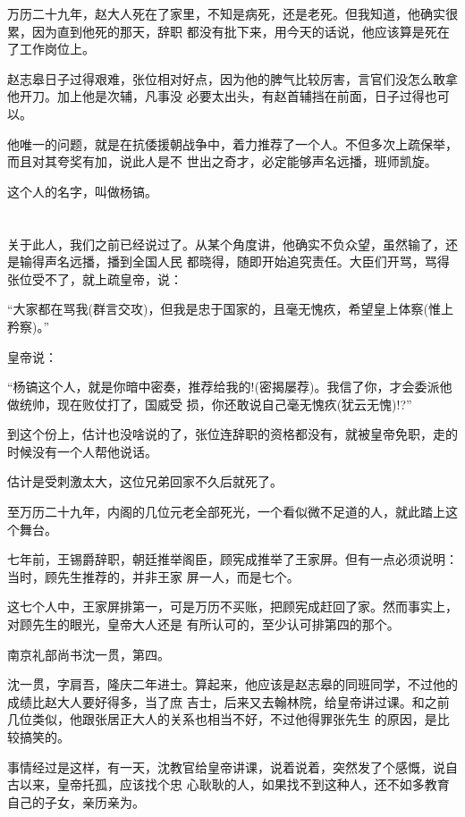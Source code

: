 \documentclass[11pt,a4paper,onecolumn]{article}
\begin{document}
万历二十九年，赵大人死在了家里，不知是病死，还是老死。但我知道，他确实很累，因为直到他死的那天，辞职
都没有批下来，用今天的话说，他应该算是死在了工作岗位上。

赵志皋日子过得艰难，张位相对好点，因为他的脾气比较厉害，言官们没怎么敢拿他开刀。加上他是次辅，凡事没
必要太出头，有赵首辅挡在前面，日子过得也可以。

他唯一的问题，就是在抗倭援朝战争中，着力推荐了一个人。不但多次上疏保举，而且对其夸奖有加，说此人是不
世出之奇才，必定能够声名远播，班师凯旋。

这个人的名字，叫做杨镐。

\section[\thesection]{}

关于此人，我们之前已经说过了。从某个角度讲，他确实不负众望，虽然输了，还是输得声名远播，播到全国人民
都晓得，随即开始追究责任。大臣们开骂，骂得张位受不了，就上疏皇帝，说：

``大家都在骂我(群言交攻)，但我是忠于国家的，且毫无愧疚，希望皇上体察(惟上矜察)。''

皇帝说：

``杨镐这个人，就是你暗中密奏，推荐给我的!(密揭屡荐)。我信了你，才会委派他做统帅，现在败仗打了，国威受
损，你还敢说自己毫无愧疚(犹云无愧)!?''

到这个份上，估计也没啥说的了，张位连辞职的资格都没有，就被皇帝免职，走的时候没有一个人帮他说话。

估计是受刺激太大，这位兄弟回家不久后就死了。

至万历二十九年，内阁的几位元老全部死光，一个看似微不足道的人，就此踏上这个舞台。

七年前，王锡爵辞职，朝廷推举阁臣，顾宪成推举了王家屏。但有一点必须说明：当时，顾先生推荐的，并非王家
屏一人，而是七个。

这七个人中，王家屏排第一，可是万历不买账，把顾宪成赶回了家。然而事实上，对顾先生的眼光，皇帝大人还是
有所认可的，至少认可排第四的那个。

南京礼部尚书沈一贯，第四。

沈一贯，字肩吾，隆庆二年进士。算起来，他应该是赵志皋的同班同学，不过他的成绩比赵大人要好得多，当了庶
吉士，后来又去翰林院，给皇帝讲过课。和之前几位类似，他跟张居正大人的关系也相当不好，不过他得罪张先生
的原因，是比较搞笑的。

事情经过是这样，有一天，沈教官给皇帝讲课，说着说着，突然发了个感慨，说自古以来，皇帝托孤，应该找个忠
心耿耿的人，如果找不到这种人，还不如多教育自己的子女，亲历亲为。
\end{document}
